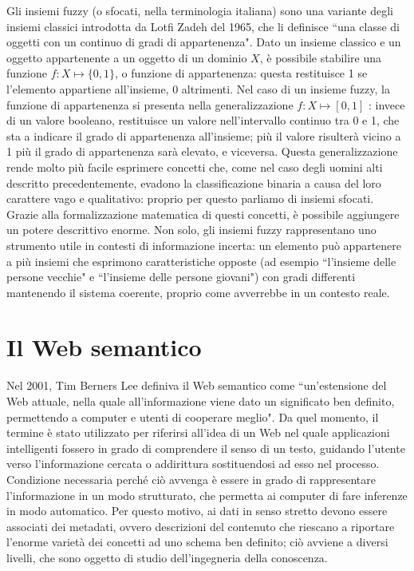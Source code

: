 \documentclass[12pt,a4paper]{report}
\begin{document}
Gli insiemi fuzzy (o sfocati, nella terminologia italiana) sono una variante degli insiemi classici introdotta da Lotfi Zadeh del 1965, che li definisce ``una classe di oggetti con un continuo di gradi di appartenenza"\cite{fuzzysetspaper}.
Dato un insieme classico e un oggetto appartenente a un oggetto di un dominio $X$, è possibile stabilire una funzione  $f: X \mapsto \{0,1\}$, o funzione di appartenenza: questa restituisce 1 se l'elemento appartiene all'insieme, 0 altrimenti.
Nel caso di un insieme fuzzy, la funzione di appartenenza si presenta nella generalizzazione  $f: X \mapsto [0,1]$ : invece di un valore booleano, restituisce un valore nell'intervallo continuo tra 0 e 1, che sta a indicare il grado di appartenenza all'insieme; più il valore risulterà vicino a 1 più il grado di appartenenza sarà elevato, e viceversa.
Questa generalizzazione rende molto più facile esprimere concetti che, come nel caso degli uomini alti descritto precedentemente, evadono la classificazione binaria a causa del loro carattere vago e qualitativo: proprio per questo parliamo di insiemi sfocati. Grazie alla formalizzazione matematica di questi concetti, è possibile aggiungere un potere descrittivo enorme. Non solo, gli insiemi fuzzy rappresentano uno strumento utile in contesti di informazione incerta: un elemento può appartenere a più insiemi che esprimono caratteristiche opposte (ad esempio ``l'insieme delle persone vecchie" e ``l'insieme delle persone giovani"\cite{fuzzysystemspaper}) con gradi differenti mantenendo il sistema coerente, proprio come avverrebbe in un contesto reale.


\section{Il Web semantico}
Nel 2001, Tim Berners Lee definiva il Web semantico come ``un'estensione del Web attuale, nella quale all'informazione viene dato un significato ben definito, permettendo a computer e utenti di cooperare meglio"\cite{semanticWebPaper}.
Da quel momento, il termine è stato utilizzato per riferirsi all'idea di un Web nel quale applicazioni intelligenti fossero in grado di comprendere il senso di un testo, guidando l'utente verso l'informazione cercata o addirittura sostituendosi ad esso nel processo.
Condizione necessaria perché ciò avvenga è essere in grado di rappresentare l'informazione in un modo strutturato, che permetta ai computer di fare inferenze in modo automatico. Per questo motivo, ai dati in senso stretto devono essere associati dei metadati, ovvero descrizioni del contenuto che riescano a riportare l'enorme varietà dei concetti ad uno schema ben definito; ciò avviene a diversi livelli, che sono oggetto di studio dell'ingegneria della conoscenza. 
\end{document}
